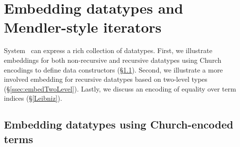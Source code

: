 \section{Embedding datatypes and Mendler-style iterators}\label{sec:fi:data}

System \Fi\ can express a rich collection of datatypes.
First, we illustrate embeddings for both non-recursive and
recursive datatypes using Church encodings \cite{Church33} to define
data constructors (\S\ref{ssec:embedChurch}). Second, we illustrate
a more involved embedding for recursive datatypes based on two-level types
(\S\ref{ssec:embedTwoLevel}). Lastly, we discuss an encoding of equality over
term indices (\S\ref{Leibniz}).

\subsection{Embedding datatypes using Church-encoded terms}
\label{ssec:embedChurch}
